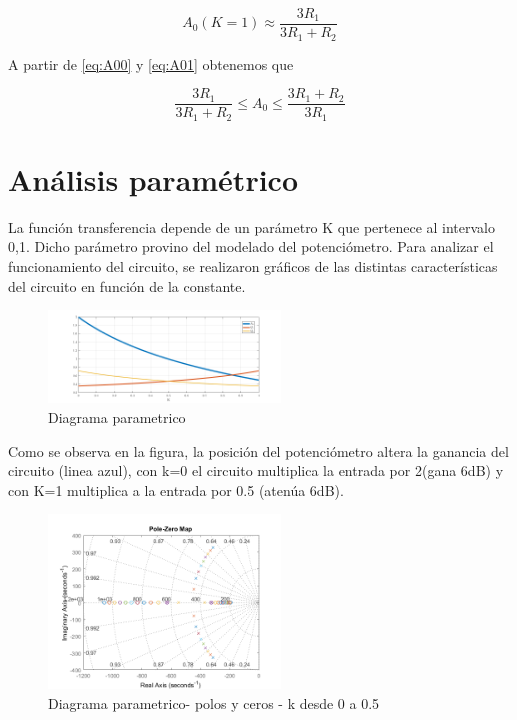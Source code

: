\documentclass[../../tc_tp3_main.tex]{subfiles}
\begin{document}
\begin{equation}
A_0(K=1) \approx \frac {3R_1}{3R_1 + R_2}\label{eq:A01}
\end{equation}

A partir de \ref{eq:A00} y \ref{eq:A01} obtenemos que

\begin{equation}
\frac {3R_1}{3R_1 + R_2} \leq A_0  \leq \frac{3R_1 + R_2}{3R_1}\label{eq:rangoA}
\end{equation}



\section{Análisis paramétrico}


La función transferencia depende de un parámetro K que pertenece al intervalo 0,1. Dicho parámetro provino del modelado del potenciómetro. Para analizar el funcionamiento del circuito, se realizaron gráficos de las distintas características del circuito en función de la constante.

\begin{figure}[H]
\centering
\includegraphics[width=0.55\textwidth]{imagenes/param.png}
\caption{Diagrama parametrico} 
\end{figure}

Como se observa en la figura, la posición del potenciómetro altera la ganancia del circuito (linea azul), con k=0 el circuito multiplica la entrada por 2(gana 6dB) y con K=1 multiplica a la entrada por 0.5 (atenúa 6dB).



\begin{figure}[H]
\centering
\includegraphics[width=0.55\textwidth]{imagenes/param005.png}
\caption{Diagrama parametrico- polos y ceros -  k desde 0 a 0.5} 
\end{figure}
\end{document}
